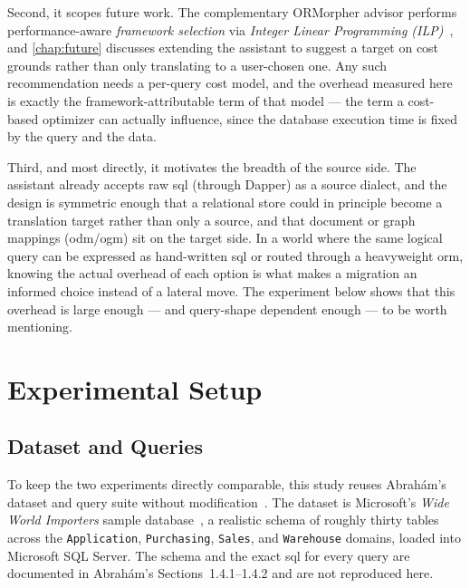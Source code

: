 Second, it scopes future work. The complementary ORMorpher advisor performs performance-aware \emph{framework selection} via \emph{Integer Linear Programming (ILP)}~\cite{abrahamUnifiedFrameworkORM}, and \cref{chap:future} discusses extending the assistant to suggest a target on cost grounds rather than only translating to a user-chosen one. Any such recommendation needs a per-query cost model, and the overhead measured here is exactly the framework-attributable term of that model --- the term a cost-based optimizer can actually influence, since the database execution time is fixed by the query and the data.

Third, and most directly, it motivates the breadth of the source side. The assistant already accepts raw \acrshort{sql} (through Dapper) as a source dialect, and the design is symmetric enough that a relational store could in principle become a translation target rather than only a source, and that document or graph mappings (\acrshort{odm}/\acrshort{ogm}) sit on the target side. In a world where the same logical query can be expressed as hand-written \acrshort{sql} or routed through a heavyweight \acrshort{orm}, knowing the actual overhead of each option is what makes a migration an informed choice instead of a lateral move. The experiment below shows that this overhead is large enough --- and query-shape dependent enough --- to be worth mentioning.

\section{Experimental Setup}
\label{sec:overhead-setup}


\subsection{Dataset and Queries}
\label{sec:overhead-queries}

To keep the two experiments directly comparable, this study reuses Abrahám's dataset and query suite without modification~\cite{abrahamFrameworkAgnosticQueryAdaptation2025}. The dataset is Microsoft's \emph{Wide World Importers} sample database~\cite{wideWorldImporters}, a realistic schema of roughly thirty tables across the \texttt{Application}, \texttt{Purchasing}, \texttt{Sales}, and \texttt{Warehouse} domains, loaded into Microsoft SQL Server. The schema and the exact \acrshort{sql} for every query are documented in Abrahám's Sections~1.4.1--1.4.2 and are not reproduced here.

